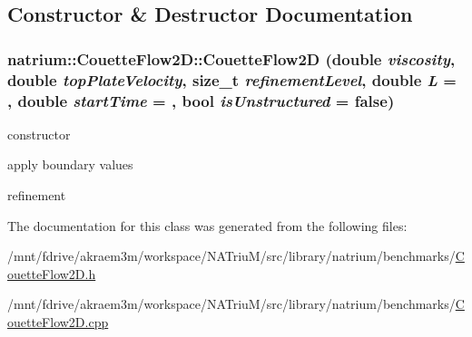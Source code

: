 \subsection{Constructor \& Destructor Documentation}
\hypertarget{classnatrium_1_1CouetteFlow2D_a94e51b7eaff3998383f1d7dc07b994cb}{
\subsubsection[{CouetteFlow2D}]{\setlength{\rightskip}{0pt plus 5cm}natrium::CouetteFlow2D::CouetteFlow2D (double {\em viscosity}, \/  double {\em topPlateVelocity}, \/  size\_\-t {\em refinementLevel}, \/  double {\em L} = {}, \/  double {\em startTime} = {}, \/  bool {\em isUnstructured} = {\ttfamily false})}}
\label{classnatrium_1_1CouetteFlow2D_a94e51b7eaff3998383f1d7dc07b994cb}


constructor 

apply boundary values

refinement 

The documentation for this class was generated from the following files:\begin{DoxyCompactItemize}
\item 
/mnt/fdrive/akraem3m/workspace/NATriuM/src/library/natrium/benchmarks/\hyperlink{CouetteFlow2D_8h}{CouetteFlow2D.h}\item 
/mnt/fdrive/akraem3m/workspace/NATriuM/src/library/natrium/benchmarks/\hyperlink{CouetteFlow2D_8cpp}{CouetteFlow2D.cpp}\end{DoxyCompactItemize}
